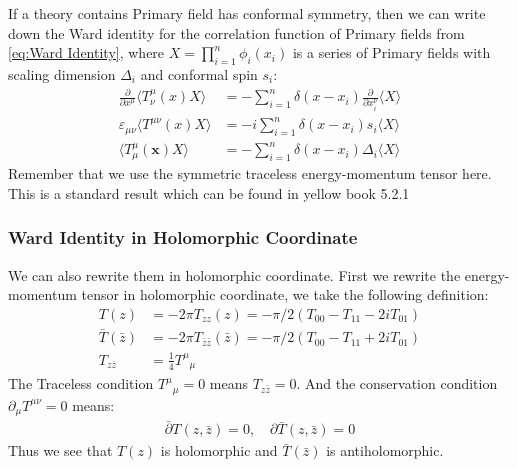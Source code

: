 If a theory contains Primary field has conformal symmetry, then we can write down the Ward identity for the correlation function of Primary fields from \cref{eq:Ward Identity}, where $ X=\prod_{i=1}^n\phi_i(x_i) $ is a series of Primary fields with scaling dimension $ \Delta_i $ and conformal spin $ s_i $:
\begin{align}\label{eq:Ward Identitycft}
  \frac{\partial}{\partial x^\mu}\langle T_\nu^\mu(x)X\rangle&=-\sum_{i=1}^n\delta(x-x_i)\frac{\partial}{\partial x_i^\nu}\langle X\rangle\\
  \varepsilon_{\mu\nu}\langle T^{\mu\nu}(x)X\rangle&=-i\sum_{i=1}^n\delta(x-x_i) s_i\langle X\rangle\\
  \langle T_\mu^\mu(\mathbf{x})X\rangle&=-\sum_{i=1}^n\delta(x-x_i)\Delta_i\langle X\rangle
\end{align}
Remember that we use the symmetric traceless energy-momentum tensor here. This is a standard result which can be found in yellow book 5.2.1

\subsubsection{Ward Identity in Holomorphic Coordinate}


We can also rewrite them in holomorphic coordinate. First we rewrite the energy-momentum tensor in holomorphic coordinate, we take the following definition:
\begin{align}\label{eq:holomorphic EM tensor}
  T(z)&= -2\pi T_{zz}(z)=-\pi/2(T_{00}-T_{11}-2iT_{01})\\
  \bar{T}(\bar{z})&=-2\pi T_{\bar{z}\bar{z}}(\bar{z})=-\pi/2(T_{00}-T_{11}+2iT_{01})\\
  T_{z\bar{z}}&=\frac{1}{4}T^\mu{}_\mu
\end{align}
The Traceless condition $ T^\mu{}_\mu=0 $ means $ T_{z\bar{z}}=0 $. And the conservation condition $ \partial_\mu T^{\mu\nu}=0 $ means:
\begin{align}
  \bar{\partial}T(z,\bar{z})=0,\quad \partial\bar{T}(z,\bar{z})=0
\end{align}
Thus we see that $ T(z) $ is holomorphic and $ \bar{T}(\bar{z}) $ is antiholomorphic. 


